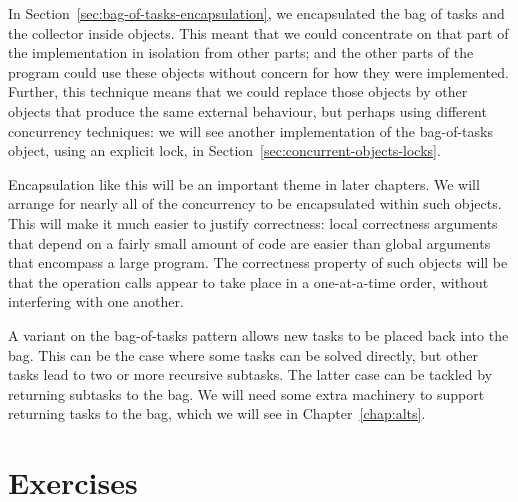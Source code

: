 In Section~\ref{sec:bag-of-tasks-encapsulation}, we encapsulated the bag of
tasks and the collector inside objects.  This meant that we could concentrate
on that part of the implementation in isolation from other parts; and the
other parts of the program could use these objects without concern for how
they were implemented.  Further, this technique means that we could replace
those objects by other objects that produce the same external behaviour, but
perhaps using different concurrency techniques: we will see another
implementation of the bag-of-tasks object, using an explicit lock, in
Section~\ref{sec:concurrent-objects-locks}.

Encapsulation like this will be an important theme in later chapters.  We will
arrange for nearly all of the concurrency to be encapsulated within such
objects.  This will make it much easier to justify correctness: local
correctness arguments that depend on a fairly small amount of code are easier
than global arguments that encompass a large program.  The correctness
property of such objects will be that the operation calls appear to take place
in a one-at-a-time order, without interfering with one another.

A variant on the bag-of-tasks pattern allows new tasks to be placed back into
the bag.  This can be the case where some tasks can be solved directly, but
other tasks lead to two or more recursive subtasks.  The latter case can be
tackled by returning subtasks to the bag.  We will need some extra machinery
to support returning tasks to the bag, which we will see in
Chapter~\ref{chap:alts}.





\section*{Exercises}











